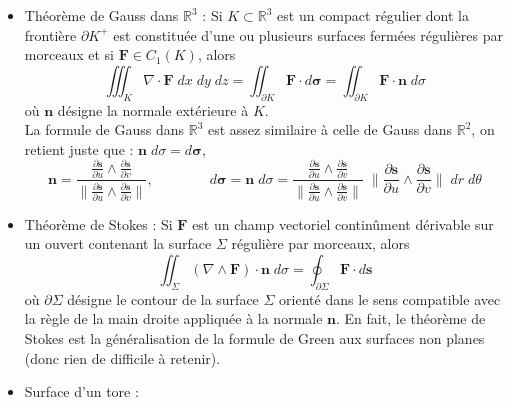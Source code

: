 \documentclass[a4paper]{article}
\begin{document}
\begin{itemize}
\item Théorème de Gauss dans $ \mathbb{R}^3 $ : Si $ K \subset \mathbb{R}^3 $ est un compact régulier dont la frontière $ \partial K^+ $ est constituée d'une ou plusieurs surfaces fermées régulières par morceaux et si $ \textbf{F} \in C_1(K) $, alors 
\[ \iiint_K \nabla \cdot \textbf{F} \; d x \; d y \; d z = \iint_{\partial K} \textbf{F} \cdot d \boldsymbol{\sigma} = \iint_{\partial K} \textbf{F} \cdot \textbf{n} \; d \sigma \]
où $ \textbf{n} $ désigne la normale extérieure à $ K $. \\
La formule de Gauss dans $ \mathbb{R}^3 $ est assez similaire à celle de Gauss dans $ \mathbb{R}^2 $, on retient juste que : 
$\displaystyle \textbf{n} \; d \sigma = d \boldsymbol{\sigma} $, 
\[ \textbf{n} = \frac{\displaystyle \frac{\partial \textbf{s}}{\partial u} \wedge \frac{\partial \textbf{s}}{\partial v} }{\displaystyle \bigg\| \frac{\partial \textbf{s}}{\partial u} \wedge \frac{\partial \textbf{s}}{\partial v} \bigg\| }, \qquad \qquad 
d \boldsymbol{\sigma} = \textbf{n} \; d \sigma = \frac{\displaystyle \frac{\partial \textbf{s}}{\partial u} \wedge \frac{\partial \textbf{s}}{\partial v} }{\displaystyle \bigg\| \frac{\partial \textbf{s}}{\partial u} \wedge \frac{\partial \textbf{s}}{\partial v} \bigg\| } \; \bigg\| \frac{\partial \textbf{s}}{\partial u} \wedge \frac{\partial \textbf{s}}{\partial v} \bigg\| \; d r \; d \theta \]






\item Théorème de Stokes : Si $ \textbf{F} $ est un champ vectoriel continûment dérivable sur un ouvert contenant la surface $ \Sigma $ régulière par morceaux, alors 
\[ \iint_\Sigma (\nabla \wedge \textbf{F}) \cdot \textbf{n} \; d \sigma = \oint_{\partial \Sigma} \textbf{F} \cdot d \textbf{s} \]
où $ \partial \Sigma $ désigne le contour de la surface $ \Sigma $ orienté dans le sens compatible avec la règle de la main droite appliquée à la normale $ \textbf{n} $.
En fait, le théorème de Stokes est la généralisation de la formule de Green aux surfaces non planes (donc rien de difficile à retenir).








\newpage








\item Surface d'un tore : 


\end{itemize}
\end{document}

